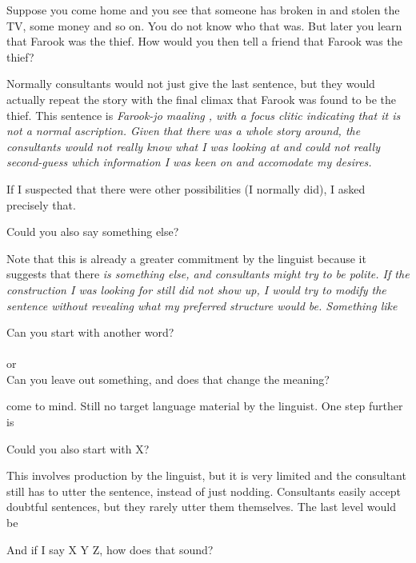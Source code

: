\ea Suppose you come home and you see that someone has broken in and stolen the TV, some money and so on. You do not know who that was. But later you learn that Farook was the thief. How would you then tell a friend that Farook was the thief? \z

Normally consultants would not just give the last sentence, but they would actually repeat the story with the final climax that Farook was found to be the thief. This sentence is \em Farook-jo maaling \em, with a focus clitic indicating that it is not a normal ascription.
Given that there was a whole story around, the consultants would not really know what I was looking at and could not really second-guess which information I was keen on and accomodate my desires.

If I suspected that there were other possibilities (I normally did), I asked precisely that.

\ea  Could you also say something else?  \z 

Note that this is already a greater commitment by the linguist because it suggests that there \em is \em something else, and consultants might try to be polite. If the construction I was looking for still did not show up, I would try to modify the sentence without revealing what my preferred structure would be. Something like 

\ea \ea Can you start with another word? \\
\\
 or \\
 
\ex Can you leave out something, and does that change the meaning? \z\z
 
come to mind. Still no target language material by the linguist. One step further is 

\ea Could you also start with X?\z

This involves production by the linguist, but it is very limited and the consultant still has to utter the sentence, instead of just nodding. Consultants easily accept doubtful sentences, but they rarely utter them themselves. The last level would be 

\ea And if I say X Y Z, how does that sound?\z

